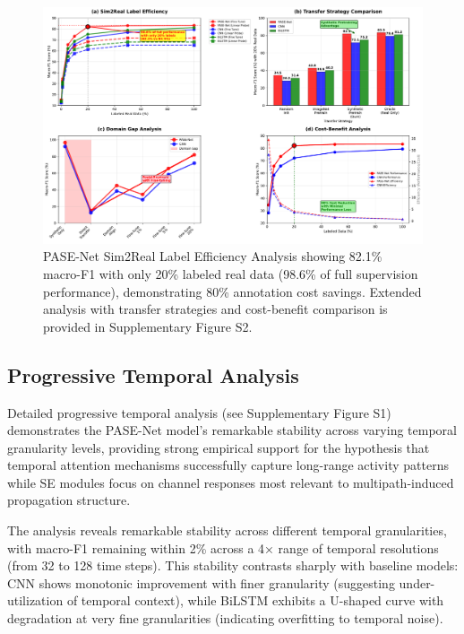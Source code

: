 \documentclass[journal]{IEEEtran}
\begin{document}
\begin{figure}[t]
\centering
\includegraphics[width=\columnwidth]{plots/fig5_label_efficiency.pdf}
\caption{PASE-Net Sim2Real Label Efficiency Analysis showing 82.1\% macro-F1 with only 20\% labeled real data (98.6\% of full supervision performance), demonstrating 80\% annotation cost savings. Extended analysis with transfer strategies and cost-benefit comparison is provided in Supplementary Figure S2.}
\label{fig:label_efficiency}
\end{figure}


\subsection{Progressive Temporal Analysis}

Detailed progressive temporal analysis (see Supplementary Figure S1) demonstrates the PASE-Net model's remarkable stability across varying temporal granularity levels, providing strong empirical support for the hypothesis that temporal attention mechanisms successfully capture long-range activity patterns while SE modules focus on channel responses most relevant to multipath-induced propagation structure.

The analysis reveals remarkable stability across different temporal granularities, with macro-F1 remaining within 2\% across a 4× range of temporal resolutions (from 32 to 128 time steps). This stability contrasts sharply with baseline models: CNN shows monotonic improvement with finer granularity (suggesting under-utilization of temporal context), while BiLSTM exhibits a U-shaped curve with degradation at very fine granularities (indicating overfitting to temporal noise).
\end{document}
